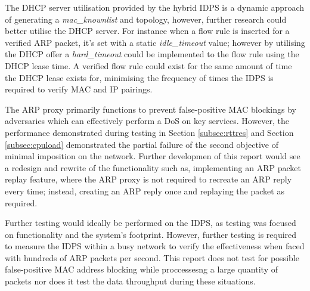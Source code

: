 \documentclass[12pt, oneside]{book}
\begin{document}
The DHCP server utilisation provided by the hybrid IDPS is a dynamic approach of generating a
\emph{mac\_knownlist} and topology, however, further research could better utilise the DHCP server.
For instance when a flow rule is inserted for a verified ARP packet,
it's set with a static \emph{idle\_timeout} value; however by utilising the DHCP offer a \emph{hard\_timeout} could be 
implemented to the flow rule using the DHCP lease time. A verified flow rule could exist for the same amount of time
the DHCP lease exists for, 
minimising the frequency of times the IDPS is required to verify MAC and IP pairings.

The ARP proxy primarily functions to prevent false-positive MAC blockings by adversaries which
can effectively perform a DoS on key services. However, the performance demonstrated during testing in Section \ref{subsec:rttres} and
Section \ref{subsec:cpuload} demonstrated the partial failure of the second objective of minimal imposition on the network.
Further developmen of this report would see a redesign and rewrite of the functionality such as, implementing an ARP packet replay feature, where
the ARP proxy is not required to recreate an ARP reply every time; instead, creating an ARP reply once and replaying
the packet as required.

Further testing would ideally be performed on the IDPS, as testing was focused on functionality and the system's footprint.
However, further testing is required to measure the IDPS within a busy network to verify the effectiveness
when faced with hundreds of ARP packets per second. This report does not test for possible false-positive
MAC address blocking while proccessesng a large quantity of packets nor does it test the data throughput during these situations.




	{}
	
\end{document}

